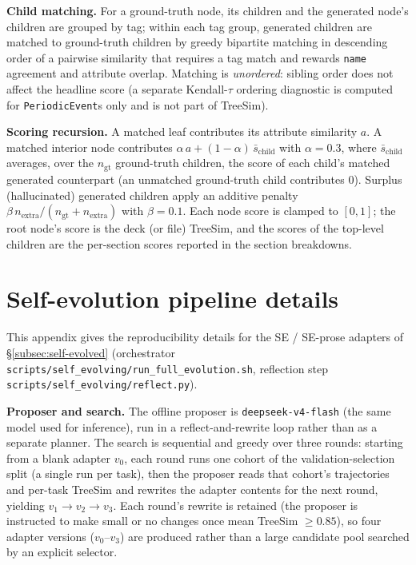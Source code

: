 \documentclass{article}
\begin{document}
\textbf{Child matching.} For a ground-truth node, its children and the generated node's children are grouped by tag; within each tag group, generated children are matched to ground-truth children by greedy bipartite matching in descending order of a pairwise similarity that requires a tag match and rewards \texttt{name} agreement and attribute overlap. Matching is \emph{unordered}: sibling order does not affect the headline score (a separate Kendall-$\tau$ ordering diagnostic is computed for \texttt{PeriodicEvent}s only and is not part of TreeSim).

\textbf{Scoring recursion.} A matched leaf contributes its attribute similarity $a$. A matched interior node contributes $\alpha\,a + (1-\alpha)\,\bar{s}_{\mathrm{child}}$ with $\alpha=0.3$, where $\bar{s}_{\mathrm{child}}$ averages, over the $n_{\mathrm{gt}}$ ground-truth children, the score of each child's matched generated counterpart (an unmatched ground-truth child contributes $0$). Surplus (hallucinated) generated children apply an additive penalty $\beta\,n_{\mathrm{extra}}/(n_{\mathrm{gt}}+n_{\mathrm{extra}})$ with $\beta=0.1$. Each node score is clamped to $[0,1]$; the root node's score is the deck (or file) TreeSim, and the scores of the top-level children are the per-section scores reported in the section breakdowns.

\section{Self-evolution pipeline details}
\label{app:selfevolve}

This appendix gives the reproducibility details for the SE / SE-prose adapters of \S\ref{subsec:self-evolved} (orchestrator \texttt{scripts/self\_evolving/run\_full\_evolution.sh}, reflection step \texttt{scripts/self\_evolving/reflect.py}).

\textbf{Proposer and search.} The offline proposer is \texttt{deepseek-v4-flash} (the same model used for inference), run in a reflect-and-rewrite loop rather than as a separate planner. The search is sequential and greedy over three rounds: starting from a blank adapter $v_0$, each round runs one cohort of the validation-selection split (a single run per task), then the proposer reads that cohort's trajectories and per-task TreeSim and rewrites the adapter contents for the next round, yielding $v_1 \to v_2 \to v_3$. Each round's rewrite is retained (the proposer is instructed to make small or no changes once mean TreeSim $\geq 0.85$), so four adapter versions ($v_0$--$v_3$) are produced rather than a large candidate pool searched by an explicit selector.
\end{document}
